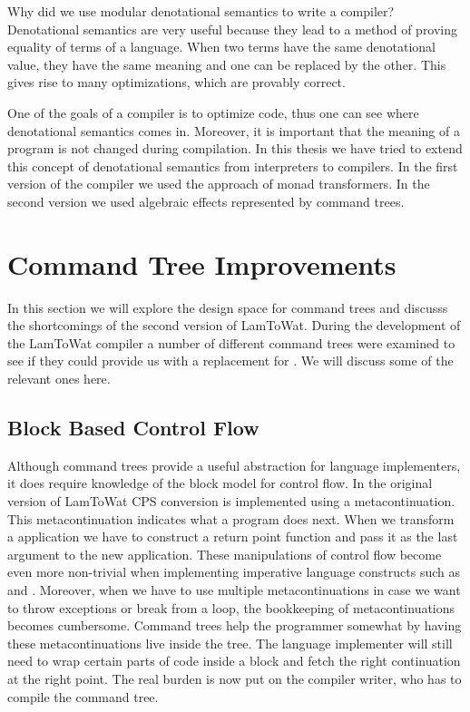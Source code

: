 Why did we use modular denotational semantics to write a compiler? Denotational semantics are very useful because they lead to a method of proving equality of terms of a language. When two terms have the same denotational value, they have the same meaning and one can be replaced by the other. This gives rise to many optimizations, which are provably correct.

One of the goals of a compiler is to optimize code, thus one can see where denotational semantics comes in. Moreover, it is important that the meaning of a program is not changed during compilation. In this thesis we have tried to extend this concept of denotational semantics from interpreters to compilers. In the first version of the compiler we used the approach of monad transformers. In the second version we used algebraic effects represented by command trees.

\section{\label{section:commandtrees}Command Tree Improvements}
In this section we will explore the design space for command trees and discusss the shortcomings of the second version of LamToWat. During the development of the LamToWat compiler a number of different command trees were examined to see if they could provide us with a replacement for . We will discuss some of the relevant ones here.

\subsection{Block Based Control Flow}
Although command trees provide a useful abstraction for language implementers, it does require knowledge of the block model for control flow. In the original version of LamToWat CPS conversion is implemented using a metacontinuation. This metacontinuation indicates what a program does next. When we transform a application we have to construct a return point function and pass it as the last argument to the new application. These manipulations of control flow become even more non-trivial when implementing imperative language constructs such as  and . Moreover, when we have to use multiple metacontinuations in case we want to throw exceptions or break from a  loop, the bookkeeping of metacontinuations becomes cumbersome. Command trees help the programmer somewhat by having these metacontinuations live inside the tree. The language implementer will still need to wrap certain parts of code inside a block and fetch the right continuation at the right point. The real burden is now put on the compiler writer, who has to compile the command tree.


